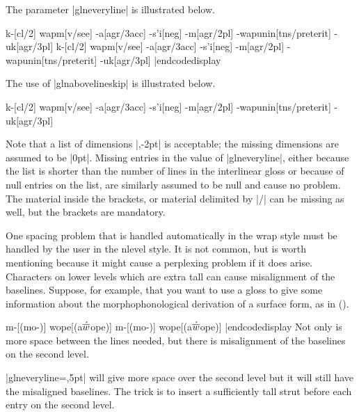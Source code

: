 The parameter |glneveryline| is illustrated below.

\framedisplay
\ex[glstyle=nlevel,glneveryline={\it,\sc,\sc}]
\begingl
k-[cl/2]
wapm[v/\rm see]
-a[agr/3acc]
-s'i[neg]
-m[agr/\sc 2pl]
-wapunin[tns/preterit]
-uk[agr/3pl]
\endilg
\endgl
\xe
\endframedisplay
\codedisplay
\ex[glstyle=nlevel,glneveryline={\it,\sc,\sc}]
\begingl
k-[cl/2]
wapm[v/\rm see]
-a[agr/3acc]
-s'i[neg]
-m[agr/\sc 2pl]
-wapunin[tns/preterit]
-uk[agr/3pl]
\endilg
\endgl
\xe
|endcodedisplay

The use of |glnabovelineskip| is illustrated below.

\framedisplay
\ex[glstyle=nlevel,glneveryline={\it,\sc,\sc},
   glnabovelineextraskip={,-2pt}]
\begingl
k-[cl/2]
wapm[v/\rm see]
-a[agr/3acc]
-s'i[neg]
-m[agr/\sc 2pl]
-wapunin[tns/preterit]
-uk[agr/3pl]
\endilg
\endgl
\xe
\endframedisplay

Note that a list of dimensions |{,-2pt}| is acceptable; the missing
dimensions are assumed to be |0pt|.  Missing entries in the value of
|glneveryline|, either because the list is shorter than the number of
lines in the interlinear gloss or because of null entries on the list,
are similarly assumed to be null and cause no problem.  The material
inside the brackets, or material delimited by |/| can be missing as
well, but the brackets are mandatory.

One spacing problem that is handled automatically in the wrap style
must be handled by the user in the nlevel style.  It is not common,
but is worth mentioning because it might cause a perplexing problem if
it does arise.  Characters on lower levels which are extra tall can
cause misalignment of the baselines.  Suppose, for example, that you
want to use a gloss to give some information about the
morphophonological derivation of a surface form, as in (\nextx).

\def\AccentedBarredW{$\acute{\hbox{$\overline w$}}$}

\framedisplay
\ex[glstyle=nlevel,glneveryline={\it}]
\begingl m-[(mo-)] wope[(a\AccentedBarredW ope)] \endilg \endgl \xe
\endframedisplay
\codedisplay
\ex[glstyle=nlevel,glneveryline={\it}]
\begingl m-[(mo-)] wope[(a\AccentedBarredW ope)] \endilg \endgl \xe
|endcodedisplay
Not only is more space between the lines needed, but there is
misalignment of the baselines on the second level.

|glneveryline={,5pt}| will give more space over the second level but
it will still have the misaligned baselines.  The trick is to insert a
sufficiently tall strut before each entry on the second level.

